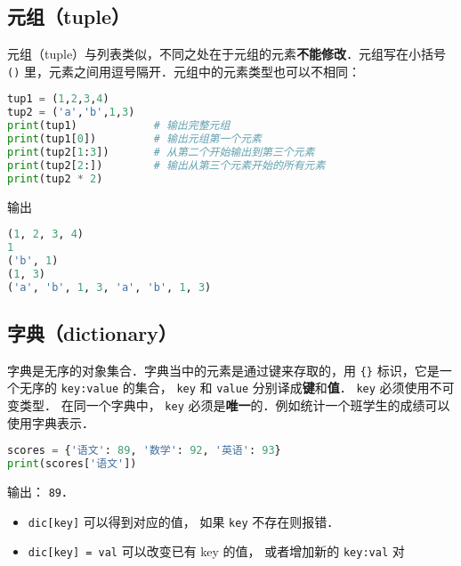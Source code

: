 \subsection{元组（tuple）}
元组（tuple）与列表类似，不同之处在于元组的元素\textbf{不能修改}．元组写在小括号 \verb|()| 里，元素之间用逗号隔开．元组中的元素类型也可以不相同：
\begin{lstlisting}[language=python]
tup1 = (1,2,3,4)
tup2 = ('a','b',1,3)
print(tup1)            # 输出完整元组
print(tup1[0])         # 输出元组第一个元素
print(tup2[1:3])       # 从第二个开始输出到第三个元素
print(tup2[2:])        # 输出从第三个元素开始的所有元素
print(tup2 * 2)
\end{lstlisting}
输出
\begin{lstlisting}[language=python]
(1, 2, 3, 4)
1
('b', 1)
(1, 3)
('a', 'b', 1, 3, 'a', 'b', 1, 3)
\end{lstlisting}

\subsection{字典（dictionary）}
字典是无序的对象集合．字典当中的元素是通过键来存取的，用 \verb|{}| 标识，它是一个无序的 \verb|key:value| 的集合， \verb|key| 和 \verb|value| 分别译成\textbf{键}和\textbf{值}． \verb|key| 必须使用不可变类型． 在同一个字典中， \verb|key| 必须是\textbf{唯一}的．例如统计一个班学生的成绩可以使用字典表示．
\begin{lstlisting}[language=python]
scores = {'语文': 89, '数学': 92, '英语': 93}
print(scores['语文'])
\end{lstlisting}
输出： \verb|89|．

\begin{itemize}
\item \verb|dic[key]| 可以得到对应的值， 如果 \verb|key| 不存在则报错．
\item \verb|dic[key] = val| 可以改变已有 key 的值， 或者增加新的 \verb|key:val| 对
\end{itemize}
